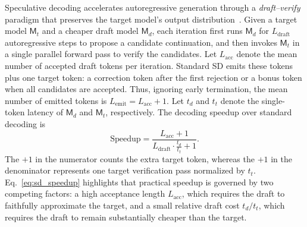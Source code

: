 Speculative decoding accelerates autoregressive generation through a \textit{draft--verify} paradigm that preserves the target model's output distribution~\citep{pmlr-v202-leviathan23a}. Given a target model $\mathsf{M}_t$ and a cheaper draft model $\mathsf{M}_d$, each iteration first runs $\mathsf{M}_d$ for $L_{\text{draft}}$ autoregressive steps to propose a candidate continuation, and then invokes $\mathsf{M}_t$ in a single parallel forward pass to verify the candidates. Let $L_{\mathrm{acc}}$ denote the mean number of accepted draft tokens per iteration. Standard SD emits these tokens plus one target token: a correction token after the first rejection or a bonus token when all candidates are accepted. Thus, ignoring early termination, the mean number of emitted tokens is $L_{\mathrm{emit}}=L_{\mathrm{acc}}+1$. Let $t_d$ and $t_t$ denote the single-token latency of $\mathsf{M}_d$ and $\mathsf{M}_t$, respectively. The decoding speedup over standard decoding is
\begin{equation}
    \text{Speedup} = \frac{L_{\mathrm{acc}} + 1}{L_{\text{draft}}\cdot \tfrac{t_d}{t_t} + 1}.
    \label{eq:sd_speedup}
\end{equation}
The $+1$ in the numerator counts the extra target token, whereas the $+1$ in the denominator represents one target verification pass normalized by $t_t$. Eq.~\ref{eq:sd_speedup} highlights that practical speedup is governed by two competing factors: a high acceptance length $L_{\mathrm{acc}}$, which requires the draft to faithfully approximate the target, and a small relative draft cost $t_d/t_t$, which requires the draft to remain substantially cheaper than the target.

